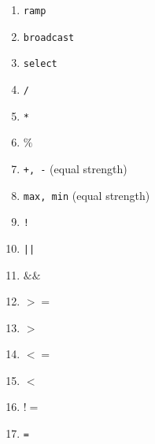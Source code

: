 \documentclass[sigplan,10pt,review,anonymous]{acmart}\settopmatter{printfolios=true,printccs=false,printacmref=false}
\begin{document}
\begin{enumerate}
  \item \texttt{ramp}
  \item \texttt{broadcast}
  \item \texttt{select}
  \item \texttt{/}
  \item \texttt{*}
  \item \texttt{$\%$}
  \item \texttt{+, -} (equal strength)
  \item \texttt{max, min} (equal strength)
  \item \texttt{!}
  \item \texttt{||}
  \item \texttt{$\&\&$}
  \item \texttt{$>=$}
  \item \texttt{$>$}
  \item \texttt{$<=$}
  \item \texttt{$<$}
  \item \texttt{$!=$}
  \item \texttt{=}
\end{enumerate}
\end{document}
